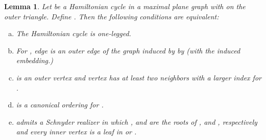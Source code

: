 \documentclass[11pt]{article}
\newtheorem{lemma}{Lemma}[section]
\begin{document}
\begin{lemma}\label{lem:Hamilton-property}
  Let  be a Hamiltonian cycle in a maximal plane graph
   with  on the outer triangle. Define .
  Then the following conditions are equivalent:
  \begin{enumerate}[(a)]
  \item The Hamiltonian cycle is one-legged.\label{enum:one-legged}
  \item For , edge  is an outer edge
of the graph  induced by
by  (with the induced embedding.)
\label{enum:outer-edge}
  \item  is an outer vertex and vertex  has at least
    two neighbors with a larger index for
    .\label{enum:two-back}
  \item  is a canonical ordering for
    .\label{enum:canonical-ordering}
 \item  admits a Schnyder realizer  in which
   ,  and  are the roots of ,  and , respectively
   and every inner vertex is a leaf in  or .\label{enum:Schnyder-wood}
  \end{enumerate}
\end{lemma}
\end{document}
